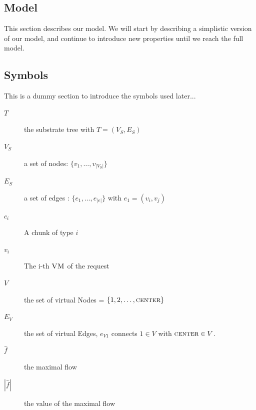 \documentclass[9pt,twocolumn]{scrartcl}
\newcommand{\VM}{\textsc{VM}}
\newcommand{\VirtualNodes}{\ensuremath{V}}
\newcommand{\VirtualEdges}{\ensuremath{E_V}}
\newcommand{\VCSwitch}{\ensuremath{\textsc{center}}}
\newcommand{\SubstrateNodes}{\ensuremath{V_S}}
\newcommand{\SubstrateEdges}{\ensuremath{E_S}}
\newcommand{\SubstrateNode}{\ensuremath{v}}
\newcommand{\SubstrateEdge}{\ensuremath{e}}
\newcommand{\achunk}{\ensuremath{c}}
\newcommand{\Tree}{\ensuremath{T}}
\begin{document}
\begin{appendix}
\section{Model}

This section describes our model. We will start by describing a simplistic
version of our model, and continue to introduce new properties until we reach
the full model.

\subsection{Symbols}

This is a dummy section to introduce the symbols used later...

\begin{description}
 \item [$\Tree$] the substrate tree with $\Tree = (\SubstrateNodes , \SubstrateEdges)$
 \item [$\SubstrateNodes$]  a set of nodes: $\{\SubstrateNode_1, \dots ,
\SubstrateNode_{|\SubstrateNodes|}\}$
 \item [$\SubstrateEdges$] a set of edges : $\{\SubstrateEdge_1, \dots ,
 \SubstrateEdge_{|\SubstrateEdge|}\}$ with $\SubstrateEdge_1 =
(\SubstrateNode_i, \SubstrateNode_j)$
 \item [$\achunk_i$] A chunk of type $i$
 \item [$v_i$] The i-th $\VM$ of the request
 \item [$\VirtualNodes$] the set of virtual Nodes = $\{1,2,\dots,\VCSwitch\}$
 \item [$\VirtualEdges$] the set of virtual Edges, $e_{V1}$ connects $1 \in
\VirtualNodes$ with $\VCSwitch \in \VirtualNodes$.
 \item [$\hat f$] the maximal flow
 \item [$|\hat f|$] the value of the maximal flow



\end{description}
\end{appendix}
\end{document}
